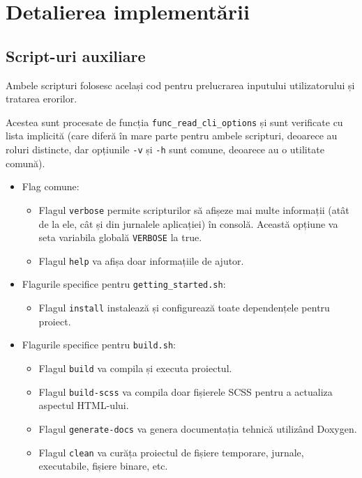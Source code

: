 \chapter{Detalierea implementării}

\section{Script-uri auxiliare}

Ambele scripturi folosesc același cod pentru prelucrarea inputului utilizatorului și tratarea erorilor.

Acestea sunt procesate de funcția \texttt{func\_read\_cli\_options} și sunt verificate cu lista implicită (care diferă în mare parte pentru ambele scripturi, deoarece au roluri distincte, dar opțiunile \texttt{-v} și \texttt{-h} sunt comune, deoarece au o utilitate comună).

\begin{itemize}
  \item Flag comune:
    \begin{itemize}
      \item Flagul \texttt{verbose} permite scripturilor să afișeze mai multe informații (atât de la ele, cât și din jurnalele aplicației) în consolă. Această opțiune va seta variabila globală \texttt{VERBOSE} la true.
      \item Flagul \texttt{help} va afișa doar informațiile de ajutor.
    \end{itemize}
  \item Flagurile specifice pentru \texttt{getting\_started.sh}:
    \begin{itemize}
      \item Flagul \texttt{install} instalează și configurează toate dependențele pentru proiect.
    \end{itemize}
  \item Flagurile specifice pentru \texttt{build.sh}:
    \begin{itemize}
      \item Flagul \texttt{build} va compila și executa proiectul.
      \item Flagul \texttt{build-scss} va compila doar fișierele SCSS pentru a actualiza aspectul HTML-ului.
      \item Flagul \texttt{generate-docs} va genera documentația tehnică utilizând Doxygen.
      \item Flagul \texttt{clean} va curăța proiectul de fișiere temporare, jurnale, executabile, fișiere binare, etc.
    \end{itemize}
\end{itemize}


